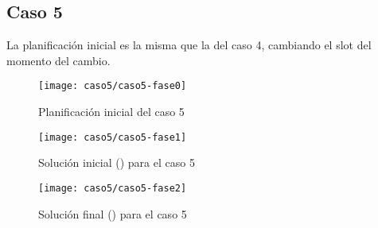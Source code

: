 %
%
%
%
%
%
\FloatBarrier
\newpage
\subsection{Caso 5}

La planificación inicial es la misma que la del caso 4, cambiando el slot del momento del cambio.

\begin{figure}[!h]
	\centering
	\texttt{[image: caso5/caso5-fase0]}
	\caption{Planificación inicial del caso 5}
	\label{fig:caso5-fase0}
\end{figure}

\begin{figure}[!h]
	\centering
	\texttt{[image: caso5/caso5-fase1]}
	\caption{Solución inicial (\faseuno{}) para el caso 5}
	\label{fig:caso5-fase1}
\end{figure}

\begin{figure}[!h]
	\centering
	\texttt{[image: caso5/caso5-fase2]}
	\caption{Solución final (\fasedos{}) para el caso 5}
	\label{fig:caso5-fase2}
\end{figure}

